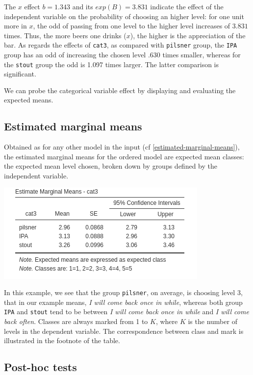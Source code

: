 \documentclass[
]{book}
\begin{document}
The \(x\) effect \(b=1.343\) and its \(exp(B)=3.831\) indicate the effect of the independent variable on the probability of choosing an higher level: for one unit more in \(x\), the odd of passing from one level to the higher level increases of \(3.831\) times. Thus, the more beers one drinks (\(x\)), the higher is the appreciation of the bar. As regards the effects of \texttt{cat3}, as compared with \texttt{pilsner} group, the \texttt{IPA} group has an odd of increasing the chosen level .630 times smaller, whereas for the \texttt{stout} group the odd is 1.097 times larger. The latter comparison is significant.

We can probe the categorical variable effect by displaying and evaluating the expected means.

\hypertarget{estimated-marginal-means-2}{%
\subsection{Estimated marginal means}\label{estimated-marginal-means-2}}

Obtained as for any other model in the input (cf \ref{estimated-marginal-means}), the estimated marginal means for the ordered model are expected mean classes: the expected mean level chosen, broken down by groups defined by the independent variable.

\includegraphics{bookletpics/3_ordinal_output5.png}

In this example, we see that the group \texttt{pilsner}, on average, is choosing level 3, that in our example means, \emph{I will come back once in while}, whereas both group \texttt{IPA} and \texttt{stout} tend to be between \emph{I will come back once in while} and \emph{I will come back often}. Classes are always marked from 1 to \(K\), where \(K\) is the number of levels in the dependent variable. The correspondence between class and mark is illustrated in the footnote of the table.

\hypertarget{post-hoc-tests-2}{%
\subsection{Post-hoc tests}\label{post-hoc-tests-2}}
\end{document}
